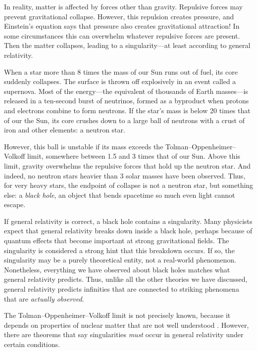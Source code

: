 \documentclass[12pt]{article}
\begin{document}
In reality, matter is affected by forces other than gravity.  Repulsive forces may prevent gravitational collapse.  However, this repulsion creates pressure, and Einstein's equation says that pressure also creates gravitational attraction!   In some circumstances this can overwhelm whatever repulsive forces are present.  Then the matter collapses, leading to a singularity---at least according to general relativity.

When a star more than 8 times the mass of our Sun runs out of fuel, its core suddenly collapses.  The surface is thrown off explosively in an event called a supernova.   Most of the energy---the equivalent of thousands of Earth masses---is released in a ten-second burst of neutrinos, formed as a byproduct when protons and electrons combine to form neutrons.  If the star's mass is below 20 times that of our the Sun, its core crushes down to a large ball of neutrons with a crust of iron and other elements: a neutron star.

However, this ball is unstable if its mass exceeds the Tolman--Oppenheimer--Volkoff limit, somewhere between 1.5 and 3 times that of our Sun.   Above this limit, gravity overwhelms the repulsive forces that hold up the neutron star.  And indeed, no neutron stars heavier than 3 solar masses have been observed.   Thus, for very heavy stars, the endpoint of collapse is not a neutron star, but something else: a \emph{black hole}, an object that bends spacetime so much even light cannot escape.

If general relativity is correct, a black hole contains a singularity.  Many physicists expect that general relativity breaks down inside a black hole, perhaps because of quantum effects that become important at strong gravitational fields.  The singularity is considered a strong hint that this breakdown occurs.   If so, the singularity may be a purely theoretical entity, not a real-world phenomenon.  Nonetheless, everything we have observed about black holes matches what general relativity predicts.  Thus, unlike all the other theories we have discussed, general relativity predicts infinities that are connected to striking phenomena that are \emph{actually observed}.

The Tolman--Oppenheimer--Volkoff limit is not precisely known, because it depends on properties of nuclear matter that are not well understood \cite{Bombaci}.  However, there are theorems that say singularities \emph{must} occur in general relativity under certain conditions.  
\end{document}
